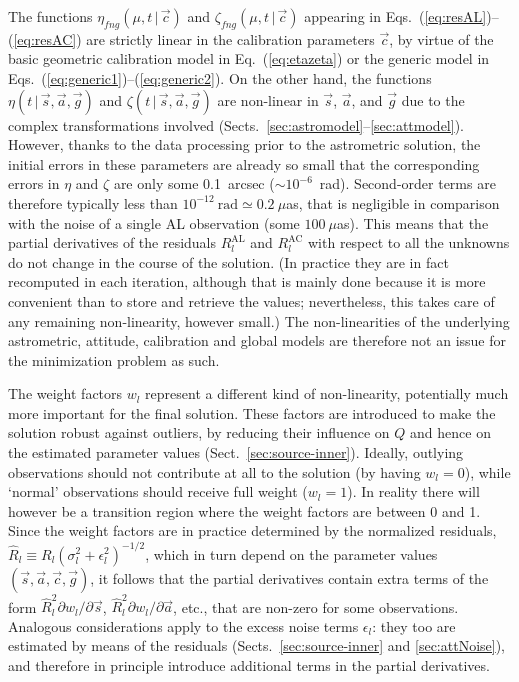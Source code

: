 \documentclass[structabstract]{aa}
\begin{document}
The functions $\eta_{fng}(\mu,t\,|\,\vec{c})$ and $\zeta_{fng}(\mu,t\,|\,\vec{c})$
appearing in Eqs.~(\ref{eq:resAL})--(\ref{eq:resAC}) are strictly linear in the
calibration parameters $\vec{c}$, by virtue of the basic geometric calibration model
in Eq.~(\ref{eq:etazeta}) or the generic model in
Eqs.~(\ref{eq:generic1})--(\ref{eq:generic2}). On the other hand, the functions
$\eta(t\,|\,\vec{s},\vec{a},\vec{g})$ and $\zeta(t\,|\,\vec{s},\vec{a},\vec{g})$
are non-linear in $\vec{s}$, $\vec{a}$, and $\vec{g}$ due to the complex
transformations involved (Sects.~\ref{sec:astromodel}--\ref{sec:attmodel}).
However, thanks to the data processing prior to the astrometric solution, the
initial errors in these parameters are already so small that the corresponding
errors in $\eta$ and $\zeta$ are only some 0.1~arcsec ($\sim 10^{-6}$~rad).
Second-order terms are therefore typically less than
$10^{-12}~\text{rad}\simeq 0.2~\mu$as, that is negligible in comparison with
the noise of a single AL observation (some $100~\mu$as). This means that the
partial derivatives of the residuals $R_l^\text{AL}$ and $R_l^\text{AC}$ with
respect to all the unknowns do not change in the course of the solution.
(In practice they are in fact recomputed in each iteration, although that is mainly
done because it is more convenient than to store and retrieve the values;
nevertheless, this takes care of any remaining non-linearity, however small.)
The non-linearities of the underlying astrometric, attitude, calibration
and global models are therefore not an issue for the minimization problem as such.

The weight factors $w_l$ 
represent a different kind of non-linearity, potentially much more important for
the final solution. These factors are introduced to make the solution robust against
outliers, by reducing their influence on $Q$ and hence on the estimated parameter
values (Sect.~\ref{sec:source-inner}). Ideally, outlying observations should not
contribute at all to the solution (by having $w_l=0$), while `normal' observations
should receive full weight ($w_l=1$). In reality there will however be a transition
region where the weight factors are between 0 and 1. Since the weight factors are
in practice determined by the normalized residuals,
$\hat{R}_l\equiv R_l(\sigma_l^2+\epsilon_l^2)^{-1/2}$, which in turn depend on
the parameter values $(\vec{s},\vec{a},\vec{c},\vec{g})$, it follows that the
partial derivatives contain extra terms of the form
$\hat{R}_l^2\partial w_l/\partial\vec{s}$, $\hat{R}_l^2\partial w_l/\partial\vec{a}$,
etc., that are non-zero for some observations. Analogous considerations apply
to the excess noise terms $\epsilon_l$: they too are estimated by means of
the residuals (Sects.~\ref{sec:source-inner} and \ref{sec:attNoise}), 
and therefore in principle introduce additional terms in the partial derivatives.
\end{document}

